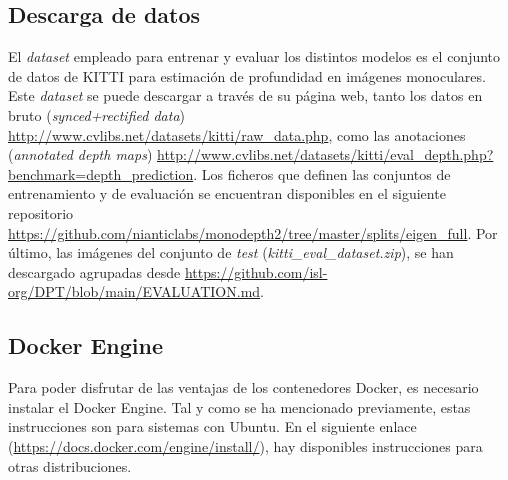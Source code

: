 \subsection{Descarga de datos}
El \textit{dataset} empleado para entrenar y evaluar los distintos modelos es el conjunto de datos de KITTI para estimación de profundidad en imágenes monoculares. Este \textit{dataset} se puede descargar a través de su página web, tanto los datos en bruto (\textit{synced+rectified data}) \url{http://www.cvlibs.net/datasets/kitti/raw_data.php}, como las anotaciones (\textit{annotated depth maps}) \url{http://www.cvlibs.net/datasets/kitti/eval_depth.php?benchmark=depth_prediction}. Los ficheros que definen las conjuntos de entrenamiento y de evaluación se encuentran disponibles en el siguiente repositorio \url{https://github.com/nianticlabs/monodepth2/tree/master/splits/eigen_full}. Por último, las imágenes del conjunto de \textit{test} (\textit{kitti{\_}eval{\_}dataset.zip}), se han descargado agrupadas desde \url{https://github.com/isl-org/DPT/blob/main/EVALUATION.md}.

\subsection{Docker Engine}
Para poder disfrutar de las ventajas de los contenedores Docker, es necesario instalar el Docker Engine. Tal y como se ha mencionado previamente, estas instrucciones son para sistemas con Ubuntu. En el siguiente enlace (\url{https://docs.docker.com/engine/install/}), hay disponibles instrucciones para otras distribuciones.

